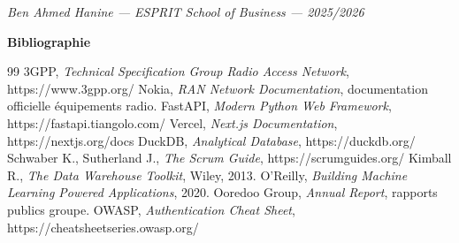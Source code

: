 \documentclass[12pt,a4paper]{report}
\begin{document}
\begin{flushright}\textit{Ben Ahmed Hanine — ESPRIT School of Business — 2025/2026}\end{flushright}

\clearpage

\vspace*{1.2cm}
{\LARGE\bfseries Bibliographie}\vspace{1cm}

\begin{thebibliography}{99}
 3GPP, \textit{Technical Specification Group Radio Access Network}, https://www.3gpp.org/
 Nokia, \textit{RAN Network Documentation}, documentation officielle équipements radio.
 FastAPI, \textit{Modern Python Web Framework}, https://fastapi.tiangolo.com/
 Vercel, \textit{Next.js Documentation}, https://nextjs.org/docs
 DuckDB, \textit{Analytical Database}, https://duckdb.org/
 Schwaber K., Sutherland J., \textit{The Scrum Guide}, https://scrumguides.org/
 Kimball R., \textit{The Data Warehouse Toolkit}, Wiley, 2013.
 O'Reilly, \textit{Building Machine Learning Powered Applications}, 2020.
 Ooredoo Group, \textit{Annual Report}, rapports publics groupe.
 OWASP, \textit{Authentication Cheat Sheet}, https://cheatsheetseries.owasp.org/
\end{thebibliography}
\end{document}
